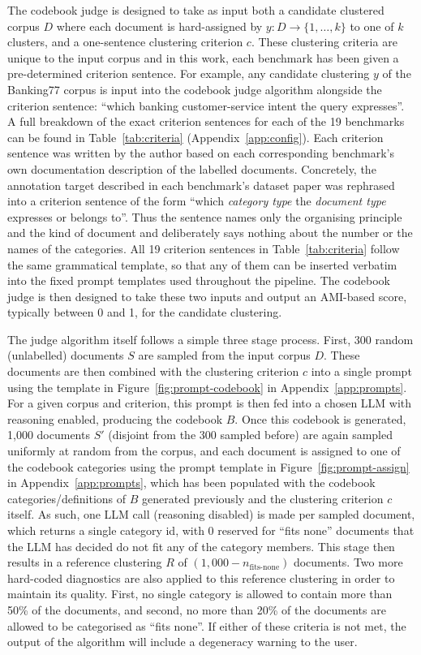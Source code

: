 \documentclass[11pt,a4paper,oneside]{report}
\begin{document}
The codebook judge is designed to take as input both a candidate clustered corpus $D$ where each document is hard-assigned by $y : D \to \{1,\dots,k\}$ to one of $k$ clusters, and a one-sentence clustering criterion $c$. These clustering criteria are unique to the input corpus and in this work, each benchmark has been given a pre-determined criterion sentence. For example, any candidate clustering $y$ of the Banking77 corpus is input into the codebook judge algorithm alongside the criterion sentence: ``which banking customer-service intent the query expresses''. A full breakdown of the exact criterion sentences for each of the 19 benchmarks can be found in Table~\ref{tab:criteria} (Appendix~\ref{app:config}). Each criterion sentence was written by the author based on each corresponding benchmark's own documentation description of the labelled documents. Concretely, the annotation target described in each benchmark's dataset paper was rephrased into a criterion sentence of the form ``which \emph{category type} the \emph{document type} expresses or belongs to''. Thus the sentence names only the organising principle and the kind of document and deliberately says nothing about the number or the names of the categories. All 19 criterion sentences in Table~\ref{tab:criteria} follow the same grammatical template, so that any of them can be inserted verbatim into the fixed prompt templates used throughout the pipeline. The codebook judge is then designed to take these two inputs and output an AMI-based score, typically between 0 and 1, for the candidate clustering.

The judge algorithm itself follows a simple three stage process. First, 300 random (unlabelled) documents $S$ are sampled from the input corpus $D$. These documents are then combined with the clustering criterion $c$ into a single prompt using the template in Figure~\ref{fig:prompt-codebook} in Appendix~\ref{app:prompts}. For a given corpus and criterion, this prompt is then fed into a chosen LLM with reasoning enabled, producing the codebook $B$. Once this codebook is generated, 1{,}000 documents $S'$ (disjoint from the 300 sampled before) are again sampled uniformly at random from the corpus, and each document is assigned to one of the codebook categories using the prompt template in Figure~\ref{fig:prompt-assign} in Appendix~\ref{app:prompts}, which has been populated with the codebook categories/definitions of $B$ generated previously and the clustering criterion $c$ itself. As such, one LLM call (reasoning disabled) is made per sampled document, which returns a single category id, with 0 reserved for ``fits none'' documents that the LLM has decided do not fit any of the category members. This stage then results in a reference clustering $R$ of $(1{,}000 - n_{\text{fits-none}})$ documents. Two more hard-coded diagnostics are also applied to this reference clustering in order to maintain its quality. First, no single category is allowed to contain more than 50\% of the documents, and second, no more than 20\% of the documents are allowed to be categorised as ``fits none''. If either of these criteria is not met, the output of the algorithm will include a degeneracy warning to the user.
\end{document}

